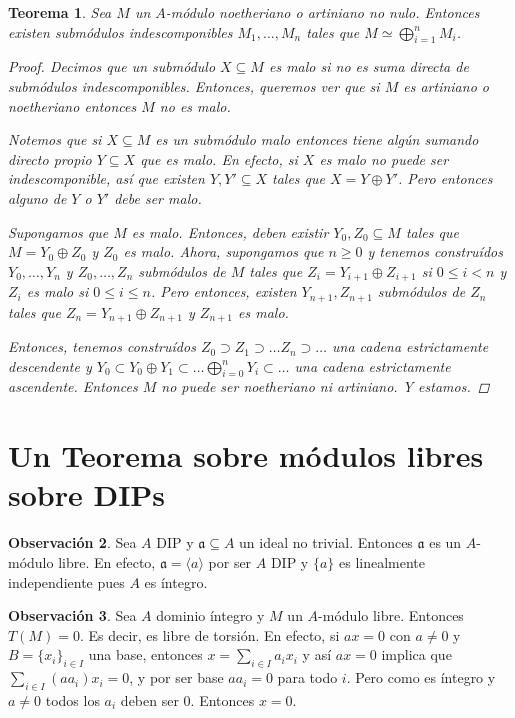 \documentclass[12pt]{book}
\newtheorem{teo}{Teorema}[section]
\theoremstyle{definition}
\newtheorem{obs}[teo]{Observación}
\begin{document}
\begin{teo}
Sea $M$ un $A$-módulo noetheriano o artiniano no nulo. Entonces existen submódulos indescomponibles $M_1,\ldots , M_n$ tales que $M\simeq \displaystyle\bigoplus_{i=1}^n M_i$.
\begin{proof}

Decimos que un submódulo $X\subseteq M$ es \textit{malo} si no es suma directa de submódulos indescomponibles. Entonces, queremos ver que si $M$ es artiniano o noetheriano entonces $M$ no es malo.

Notemos que si $X\subseteq M$ es un submódulo malo entonces tiene algún sumando directo propio $Y\subseteq X$ que es malo. En efecto, si $X$ es malo no puede ser indescomponible, así que existen $Y,Y'\subseteq X$ tales que $X=Y\oplus Y'$. Pero entonces alguno de $Y$ o $Y'$ debe ser malo.

Supongamos que $M$ es malo. Entonces, deben existir $Y_0,Z_0\subseteq M$ tales que $M=Y_0\oplus Z_0$ y $Z_0$ es malo. Ahora, supongamos que $n\geq 0$ y tenemos construídos $Y_0,\ldots , Y_n$ y $Z_0,\ldots ,Z_n$ submódulos de $M$ tales que $Z_i = Y_{i+1}\oplus Z_{i+1}$ si $0\leq i<n$ y $Z_i$ es malo si $0\leq i\leq n$. Pero entonces, existen $Y_{n+1},Z_{n+1}$ submódulos de $Z_n$ tales que $Z_n = Y_{n+1}\oplus Z_{n+1}$ y $Z_{n+1}$ es malo.

Entonces, tenemos construídos $Z_0\supset Z_1\supset \ldots Z_n\supset\ldots$ una cadena estrictamente descendente y $Y_0\subset Y_0\oplus Y_1\subset \ldots \displaystyle\bigoplus_{i=0}^{n}Y_i\subset\ldots$ una cadena estrictamente ascendente. Entonces $M$ no puede ser noetheriano ni artiniano. Y estamos.

\end{proof}
\end{teo}

\section{Un Teorema sobre módulos libres sobre DIPs}

\begin{obs}
Sea $A$ DIP y $\mathfrak{a}\subseteq A$ un ideal no trivial. Entonces $\mathfrak{a}$ es un $A$-módulo libre. En efecto, $\mathfrak{a}=\langle a\rangle$ por ser $A$ DIP y $\{a\}$ es linealmente independiente pues $A$ es íntegro.
\end{obs}

\begin{obs}
Sea $A$ dominio íntegro y $M$ un $A$-módulo libre. Entonces $T(M)=0$. Es decir, es libre de torsión. En efecto, si $ax=0$ con $a\neq 0$ y $B=\{x_i\}_{i\in I}$ una base, entonces $x=\displaystyle\sum_{i\in I}a_i x_i$ y así $ax=0$ implica que $\displaystyle\sum_{i\in I} (aa_i)x_i=0$, y por ser base $aa_i=0$ para todo $i$. Pero como es íntegro y $a\neq 0$ todos los $a_i$ deben ser $0$. Entonces $x=0$.
\end{obs}
\end{document}
